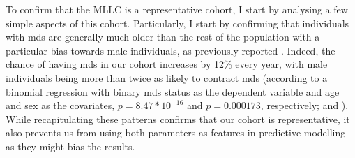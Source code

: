 To confirm that the MLLC is a representative cohort, I start by analysing a few simple aspects of this cohort. Particularly, I start by confirming that individuals with \ac{mds} are generally much older than the rest of the population with a particular bias towards male individuals, as previously reported \cite{Rollison2008-yg}. Indeed, the chance of having \ac{mds} in our cohort increases by 12\% every year, with male individuals being more than twice as likely to contract \ac{mds} (according to a binomial regression with binary \ac{mds} status as the dependent variable and age and sex as the covariates, $p=8.47*10^{-16}$ and $p=0.000173$, respectively;  and ). While recapitulating these patterns confirms that our cohort is representative, it also prevents us from using both parameters as features in predictive modelling as they might bias the results.

\begin{figure}[!ht]
    \label{fig:mds-age}
\end{figure}

\begin{figure}[!ht]
    \label{fig:mds-sex}
\end{figure}

